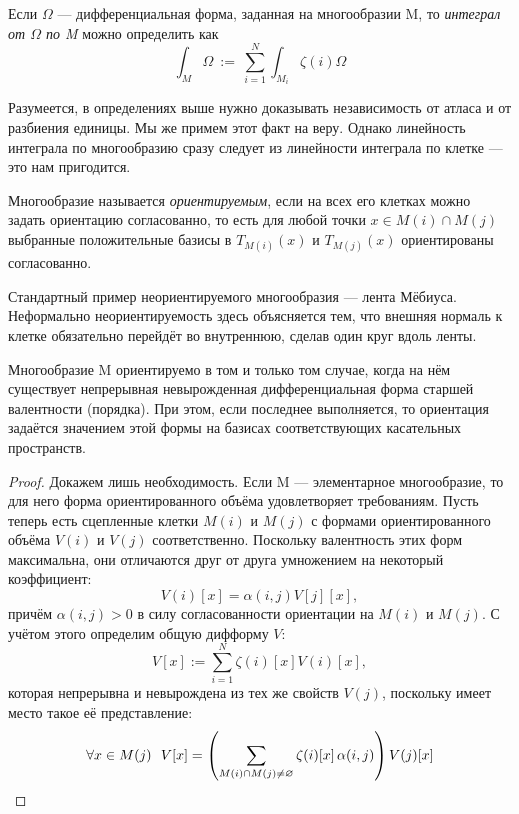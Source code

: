 \begin{definition}
	Если $\Omega$ --- дифференциальная форма, заданная на многообразии M, то \textit{интеграл от $\Omega$ по M} можно определить как
	\[
		\int_M \Omega \ := \ \sum_{i=1}^N \int_{M_i} \zeta(i)\Omega
	\]
\end{definition}

\begin{note}
	Разумеется, в определениях выше нужно доказывать независимость от атласа и от разбиения единицы. Мы же примем этот факт на веру. Однако линейность интеграла по многообразию сразу следует из линейности интеграла по клетке --- это нам пригодится.
\end{note}

\begin{definition}
	Многообразие называется \textit{ориентируемым}, если на всех его клетках можно задать ориентацию согласованно, то есть для любой точки $x \in M(i) \cap M(j)$ выбранные положительные базисы в $T_{M(i)}(x)$ и $T_{M(j)}(x)$ ориентированы согласованно.
\end{definition}

\begin{example}
	Стандартный пример неориентируемого многообразия --- лента Мёбиуса. Неформально неориентируемость здесь объясняется тем, что внешняя нормаль к клетке обязательно перейдёт во внутреннюю, сделав один круг вдоль ленты.
\end{example}

\begin{proposition}
	Многообразие M ориентируемо в том и только том случае, когда на нём существует непрерывная невырожденная дифференциальная форма старшей валентности (порядка). При этом, если последнее выполняется, то ориентация задаётся значением этой формы на базисах соответствующих касательных пространств.
\end{proposition}

\begin{proof}
	Докажем лишь необходимость. Если M --- элементарное многообразие, то для него форма ориентированного объёма удовлетворяет требованиям. Пусть теперь есть сцепленные клетки $M(i)$ и $M(j)$ с формами ориентированного объёма $V(i)$ и $V(j)$ соответственно. Поскольку валентность этих форм максимальна, они отличаются друг от друга умножением на некоторый коэффициент:
	\[
		V(i)[x] = \alpha(i, j)V[j][x],
	\]
	причём $\alpha(i, j) > 0$ в силу согласованности ориентации на $M(i)$ и $M(j)$. С учётом этого определим общую дифформу $V$:
	\[
		V[x] := \sum_{i=1}^N \zeta(i)[x] V(i)[x],
	\]
	которая непрерывна и невырождена из тех же свойств $V(j)$, поскольку имеет место такое её представление:
	\[
		\forall x \in M(j) \ \ V[x] = \left(\sum_{M(i) \cap M(j) \neq \varnothing} \zeta(i)[x] \, \alpha(i, j)\right) V(j)[x]
	\]
\end{proof}

